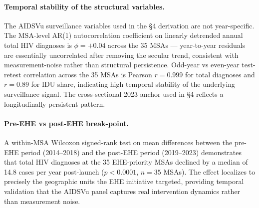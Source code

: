 \documentclass[12pt]{article}
\begin{document}
\paragraph{Temporal stability of the structural variables.} The AIDSVu surveillance variables used in the §4 derivation are not year-specific. The MSA-level AR(1) autocorrelation coefficient on linearly detrended annual total HIV diagnoses is $\phi = +0.04$ across the 35 MSAs --- year-to-year residuals are essentially uncorrelated after removing the secular trend, consistent with measurement-noise rather than structural persistence. Odd-year vs even-year test-retest correlation across the 35 MSAs is Pearson $r = 0.999$ for total diagnoses and $r = 0.89$ for IDU share, indicating high temporal stability of the underlying surveillance signal. The cross-sectional 2023 anchor used in §4 reflects a longitudinally-persistent pattern.

\paragraph{Pre-EHE vs post-EHE break-point.} A within-MSA Wilcoxon signed-rank test on mean differences between the pre-EHE period (2014--2018) and the post-EHE period (2019--2023) demonstrates that total HIV diagnoses at the 35 EHE-priority MSAs declined by a median of 14.8 cases per year post-launch ($p < 0.0001$, $n = 35$ MSAs). The effect localizes to precisely the geographic units the EHE initiative targeted, providing temporal validation that the AIDSVu panel captures real intervention dynamics rather than measurement noise.
\end{document}
